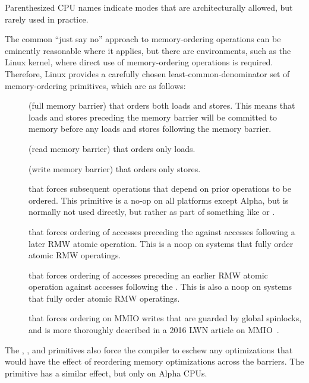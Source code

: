 Parenthesized CPU names indicate modes that are architecturally allowed,
but rarely used in practice.

The common ``just say no'' approach to memory-ordering operations
can be eminently reasonable where it applies,
but there are environments, such as the Linux kernel, where direct
use of memory-ordering operations is required.
Therefore,
Linux provides a carefully chosen least-common-denominator
set of memory-ordering primitives, which are as follows:
\begin{description}
\item	[] (full memory barrier) that orders both loads and
	stores.
	This means that loads and stores preceding the memory barrier
	will be committed to memory before any loads and stores
	following the memory barrier.
\item	[] (read memory barrier) that orders only loads.
\item	[] (write memory barrier) that orders only stores.
\item	[] that forces subsequent operations
	that depend on prior operations to be ordered.
	This primitive is a no-op on all platforms except Alpha, but
	is normally not used directly, but rather as part of
	something like  or
	.
\item	[] that forces ordering of accesses
	preceding the  against accesses following
	a later RMW atomic operation.
	This is a noop on systems that fully order atomic RMW operatings.
\item	[] that forces ordering of accesses
	preceding an earlier RMW atomic operation against accesses
	following the .
	This is also a noop on systems that fully order atomic RMW operatings.
\item	[] that forces ordering on MMIO writes that are guarded
	by global spinlocks, and is more thoroughly described
	in a 2016 LWN article on MMIO~\cite{PaulEMcKenney2016LinuxKernelMMIO}.
\end{description}
The , , and 
primitives also force
the compiler to eschew any optimizations that would have the effect
of reordering memory optimizations across the barriers.
The  primitive has a similar effect, but
only on Alpha CPUs.

